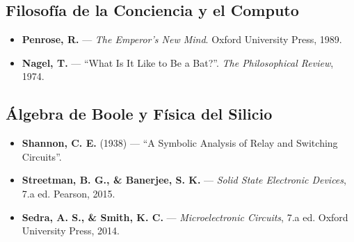\documentclass[11pt, letterpaper]{article}
\begin{document}
\subsection*{Filosof\'ia de la Conciencia y el Computo}
\begin{itemize}
  \item \textbf{Penrose, R.} --- \emph{The Emperor's New Mind}. Oxford University Press, 1989.
  \item \textbf{Nagel, T.} --- ``What Is It Like to Be a Bat?''. \textit{The Philosophical Review}, 1974.
\end{itemize}

\subsection*{\'Algebra de Boole y F\'isica del Silicio}
\begin{itemize}
  \item \textbf{Shannon, C. E.} (1938) --- ``A Symbolic Analysis of Relay and Switching Circuits''.
  \item \textbf{Streetman, B. G., \& Banerjee, S. K.} --- \emph{Solid State Electronic Devices}, 7.a ed. Pearson, 2015. 
  \item \textbf{Sedra, A. S., \& Smith, K. C.} --- \emph{Microelectronic Circuits}, 7.a ed. Oxford University Press, 2014. 
\end{itemize}
\end{document}
